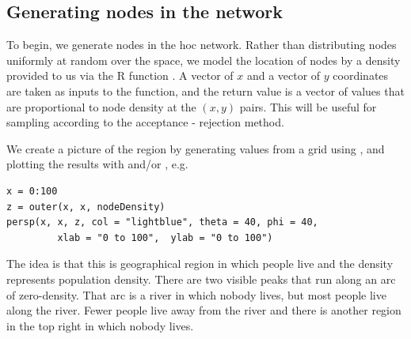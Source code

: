 \subsection{Generating nodes in the network}
To begin, we generate nodes in the hoc network.  Rather than
distributing nodes uniformly at random over the space, we model the
location of nodes by a density provided to us via the R function
. A vector of $x$ and a vector of $y$
coordinates are taken as inputs to the function, and the return value
is a vector of values that are proportional to node density at the
$(x, y)$ pairs. This will be useful for sampling according to
the acceptance - rejection method.




We create a picture of the region by generating values from a grid
using , and plotting the results with
 and/or , e.g.
\begin{verbatim}
x = 0:100
z = outer(x, x, nodeDensity)
persp(x, x, z, col = "lightblue", theta = 40, phi = 40,
         xlab = "0 to 100",  ylab = "0 to 100")
\end{verbatim}


The idea is that this is geographical region in which people live
and the density represents population density.  There are two
visible peaks that run along an arc of zero-density.  That arc is a
river in which nobody lives, but most people live along the river.
Fewer people live away from the river and there is another
region in the top right in which nobody lives.


